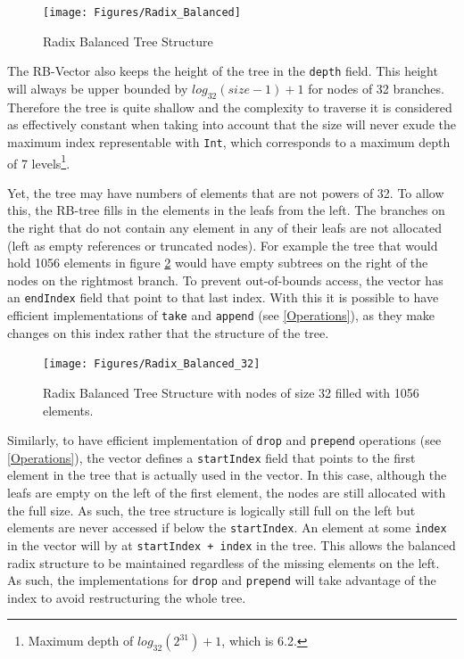 \begin{figure}[h!]
  \centering
  \texttt{[image: Figures/Radix\_Balanced]}
  \caption{Radix Balanced Tree Structure}
   \label{badix_balanced}
\end{figure}

The RB-Vector also keeps the height of the tree in the \texttt{depth} field. This height will always be upper bounded by $log_{32}(size-1)+1$ for nodes of 32 branches. Therefore the tree is quite shallow and the complexity to traverse it is considered as effectively constant when taking into account that the size will never exude the maximum index representable with \texttt{Int}, which corresponds to a maximum depth of 7 levels\footnote{Maximum depth of $log_{32}(2^{31}) + 1$, which is 6.2.}.

Yet, the tree may have numbers of elements that are not powers of 32. To allow this, the RB-tree fills in the elements in the leafs from the left. The branches on the right that do not contain any element in any of their leafs are not allocated (left as empty references or truncated nodes). For example the tree that would hold 1056 elements in figure \ref{badix_balanced_32} would have empty subtrees on the right of the nodes on the rightmost branch. To prevent out-of-bounds access, the vector has an \texttt{endIndex} field that point to that last index. With this it is possible to have efficient implementations of \texttt{take} and \texttt{append} (see \ref{Operations}), as they make changes on this index rather that the structure of the tree.

\begin{figure}[h!]
  \centering
  \texttt{[image: Figures/Radix\_Balanced\_32]}
  \caption{Radix Balanced Tree Structure with nodes of size 32 filled with 1056 elements.}
   \label{badix_balanced_32}
\end{figure}

Similarly, to have efficient implementation of \texttt{drop} and \texttt{prepend} operations (see \ref{Operations}), the vector defines a \texttt{startIndex} field that points to the first element in the tree that is actually used in the vector. In this case, although the leafs are empty on the left of the first element, the nodes are still allocated with the full size. As such, the tree structure is logically still full on the left but elements are never accessed if below the \texttt{startIndex}. An element at some \texttt{index} in the vector will by at \texttt{startIndex + index} in the tree. This allows the balanced radix structure to be maintained regardless of the missing elements on the left. As such, the implementations for \texttt{drop} and \texttt{prepend} will take advantage of the index to avoid restructuring the whole tree.

